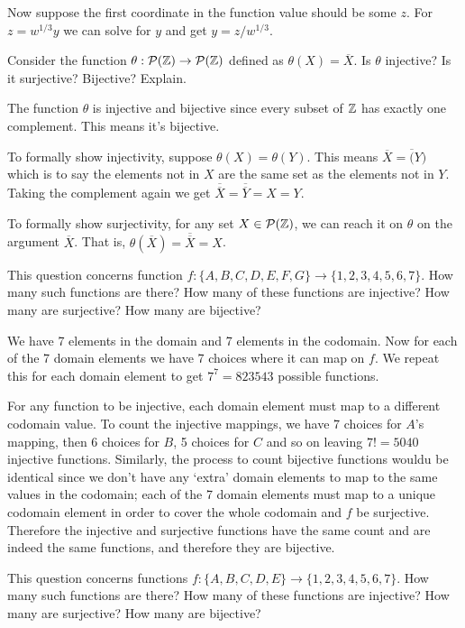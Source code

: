 \documentclass{article}
\begin{document}
Now suppose the first coordinate in the function value should be some $z$. For $z = w^{1/3}y$ we can solve for $y$ and get $y = z/w^{1/3}$.

\begin{problem}
Consider the function $\theta: \mathcal{P}(\mathbb{Z}) \to \mathcal{P}(\mathbb{Z})$ defined as $\theta(X) = \overline{X}.$ Is $\theta$ injective? Is it surjective? Bijective? Explain.
\end{problem}

The function $\theta$ is injective and bijective since every subset of $\mathbb{Z}$ has exactly one complement. This means it's bijective.

To formally show injectivity, suppose $\theta(X) = \theta(Y)$. This means $\overline{X} = \overline(Y)$ which is to say the elements not in $X$ are the same set as the elements not in $Y$. Taking the complement again we get $\overline{\overline{X}} = \overline{\overline{Y}} = X = Y$.

To formally show surjectivity, for any set $X \in \mathcal{P}(\mathbb{Z})$, we can reach it on $\theta$ on the argument $\overline{X}$. That is, $\theta(\overline{X}) = \overline{\overline{X}} = X$.

\begin{problem}
This question concerns function $f: \{A, B, C, D, E, F, G\} \to \{1, 2, 3, 4, 5, 6, 7\}. $ How many such functions are there? How many of these functions are injective? How many are surjective? How many are bijective?
\end{problem}


We have 7 elements in the domain and 7 elements in the codomain. Now for each of the 7 domain elements we have 7 choices where it can map on $f$. We repeat this for each domain element to get $7^7 = 823543$ possible functions.

For any function to be injective, each domain element must map to a different codomain value. To count the injective mappings, we have 7 choices for $A$'s mapping, then 6 choices for $B$, 5 choices for $C$ and so on leaving $7! = 5040$ injective functions. Similarly, the process to count bijective functions wouldu be identical since we don't have any `extra' domain elements to map to the same values in the codomain; each of the 7 domain elements must map to a unique codomain element in order to cover the whole codomain and $f$ be surjective. Therefore the injective and surjective functions have the same count and are indeed the same functions, and therefore they are bijective.

\begin{problem}
This question concerns functions $f: \{A, B, C, D, E\} \to \{1, 2, 3, 4, 5, 6, 7\}.$ How many such functions are there? How many of these functions are injective? How many are surjective? How many are bijective?
\end{problem}
\end{document}
